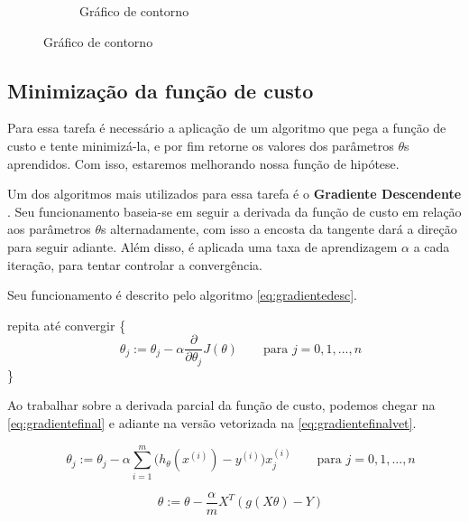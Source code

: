 \begin{figure}
\begin{subfigure}[htb]{0.5\textwidth}
    \caption{Gráfico de contorno} \label{fig:funcaodecustocontorno}
  \end{subfigure} 

\end{figure}


\subsection{Minimização da função de custo}

Para essa tarefa é necessário a aplicação de um algoritmo que pega a função de custo e tente minimizá-la, e por fim retorne os valores dos parâmetros $ \theta $s aprendidos. Com isso, estaremos melhorando nossa função de hipótese. 

Um dos algoritmos mais utilizados para essa tarefa é o \textbf{Gradiente Descendente} \cite{michalski2013machine}. Seu funcionamento baseia-se em seguir a derivada da função de custo em relação aos parâmetros $\theta$s alternadamente, com isso a encosta da tangente dará a direção para seguir adiante. Além disso, é aplicada uma taxa de aprendizagem $ \alpha $ a cada iteração, para tentar controlar a convergência.

Seu funcionamento é descrito pelo algoritmo \ref{eq:gradientedesc}.

repita até convergir \{
\begin{equation}
\label{eq:gradientedesc}
\quad \theta_j := \theta_j - \alpha \frac{\partial}{\partial\theta_j} J(\theta)   \quad\quad \text{para } j=0,1,...,n
\end{equation}
\quad\quad\quad \}

Ao trabalhar sobre a derivada parcial da função de custo, podemos chegar na \autoref{eq:gradientefinal} e adiante na versão vetorizada na \autoref{eq:gradientefinalvet}. 

\begin{equation}
\quad \theta_j := \theta_j - \alpha \sum\limits_{i=1}^{m}\Big(h_{\theta}(x^{(i)}) - y^{(i)} \Big) x_j^{(i)}   \quad\quad \text{para } j=0,1,...,n \label{eq:gradientefinal} 
\end{equation}

\begin{equation}
\quad \theta := \theta - \frac{\alpha}{m}X^T(g(X\theta) - Y) \label{eq:gradientefinalvet}
\end{equation}

